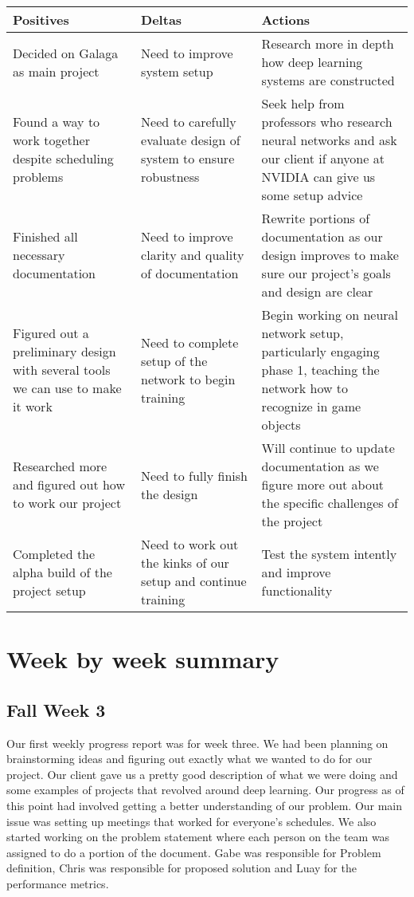 \documentclass[onecolumn, draftclsnofoot,10pt, compsoc]{IEEEtran}
\begin{document}
\begin{center}
\begin{tabu} to 0.9\linewidth{ || X[l] | X[l] | X[l] || }
	\hline
	Positives & Deltas & Actions \\
	\hline\hline
	Decided on Galaga as main project & Need to improve system setup & Research more in depth how deep learning systems are constructed \\ \hline
	Found a way to work together despite scheduling problems & Need to carefully evaluate design of system to ensure robustness & Seek help from professors who research neural networks and ask our client if anyone at NVIDIA can give us some setup advice \\ \hline
	Finished all necessary documentation & Need to improve clarity and quality of documentation & Rewrite portions of documentation as our design improves to make sure our project's goals and design are clear \\ \hline
	Figured out a preliminary design with several tools we can use to make it work & Need to complete setup of the network to begin training & Begin working on neural network setup, particularly engaging phase 1, teaching the network how to recognize in game objects \\ \hline
	Researched more and figured out how to work our project & Need to fully finish the design & Will continue to update documentation as we figure more out about the specific challenges of the project \\ \hline
	Completed the alpha build of the project setup & Need to work out the kinks of our setup and continue training & Test the system intently and improve functionality \\ \hline
\end{tabu}
\end{center}

\section{Week by week summary}

\subsection{Fall Week 3}
Our first weekly progress report was for week three.
We had been planning on brainstorming ideas and figuring out exactly what we wanted to do for our project.
Our client gave us a pretty good description of what we were doing and some examples of projects that revolved around deep learning.
Our progress as of this point had involved getting a better understanding of our problem.
Our main issue was setting up meetings that worked for everyone's schedules.
We also started working on the problem statement where each person on the team was assigned to do a portion of the document.
Gabe was responsible for Problem definition, Chris was responsible for proposed solution and Luay for the performance metrics.
\end{document}
